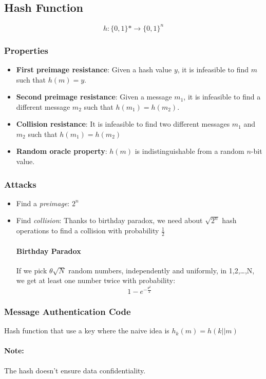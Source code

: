 \subsection{Hash Function}

$$h:\{0,1\}*\rightarrow\{0,1\}^n$$

\subsubsection{Properties}

\begin{itemize}
    \item \textbf{First preimage resistance}: Given a hash value $y$, it is infeasible to
        find $m$ such that $h(m) = y$.
    \item \textbf{Second preimage resistance}: Given a message $m_1$, it is infeasible
        to find a different message $m_2$ such that $h(m_1)=h(m_2)$.
    \item \textbf{Collision resistance}: It is infeasible to find two different messages
        $m_1$ and $m_2$ such that $h(m_1)=h(m_2)$
    \item \textbf{Random oracle property}: $h(m)$ is indistinguishable from a
        random $n$-bit value.
\end{itemize}

\subsubsection{Attacks}
\begin{itemize}
    \item Find a \textit{preimage}: $2^n$
    \item Find \textit{collision}: Thanks to birthday paradox,
        we need about $\sqrt{2^n}$ hash operations to find a
        collision with probability $\frac{1}{2}$

        \paragraph{Birthday Paradox} If we pick $\theta\sqrt{N}$ random numbers,
        independently and uniformly, in {1,2,\ldots,N}, we get at least one number twice
        with probability:
        $$1-e^{-\frac{\theta^2}{2}}$$
\end{itemize}

\subsubsection{Message Authentication Code} 
Hash function that use a key where the naive idea is $h_k(m) = h(k||m)$
\paragraph{Note:} The hash doesn't ensure data confidentiality.

